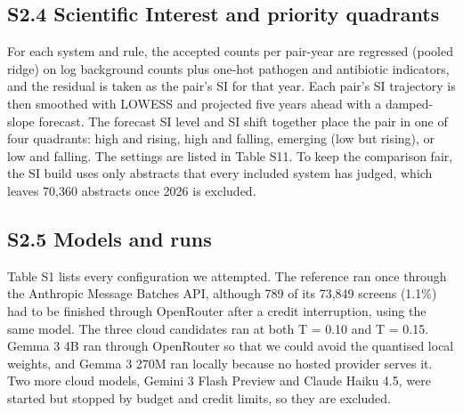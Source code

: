 \documentclass[11pt,a4paper]{article}
\begin{document}
\subsection{S2.4  Scientific Interest and priority quadrants}
For each system and rule, the accepted counts per pair-year are regressed (pooled ridge) on log background counts plus one-hot pathogen and antibiotic indicators, and the residual is taken as the pair's SI for that year. Each pair's SI trajectory is then smoothed with LOWESS and projected five years ahead with a damped-slope forecast. The forecast SI level and SI shift together place the pair in one of four quadrants: high and rising, high and falling, emerging (low but rising), or low and falling. The settings are listed in Table S11. To keep the comparison fair, the SI build uses only abstracts that every included system has judged, which leaves 70,360 abstracts once 2026 is excluded.

\subsection{S2.5  Models and runs}
Table S1 lists every configuration we attempted. The reference ran once through the Anthropic Message Batches API, although 789 of its 73,849 screens (1.1\%) had to be finished through OpenRouter after a credit interruption, using the same model. The three cloud candidates ran at both T = 0.10 and T = 0.15. Gemma 3 4B ran through OpenRouter so that we could avoid the quantised local weights, and Gemma 3 270M ran locally because no hosted provider serves it. Two more cloud models, Gemini 3 Flash Preview and Claude Haiku 4.5, were started but stopped by budget and credit limits, so they are excluded.
\end{document}
